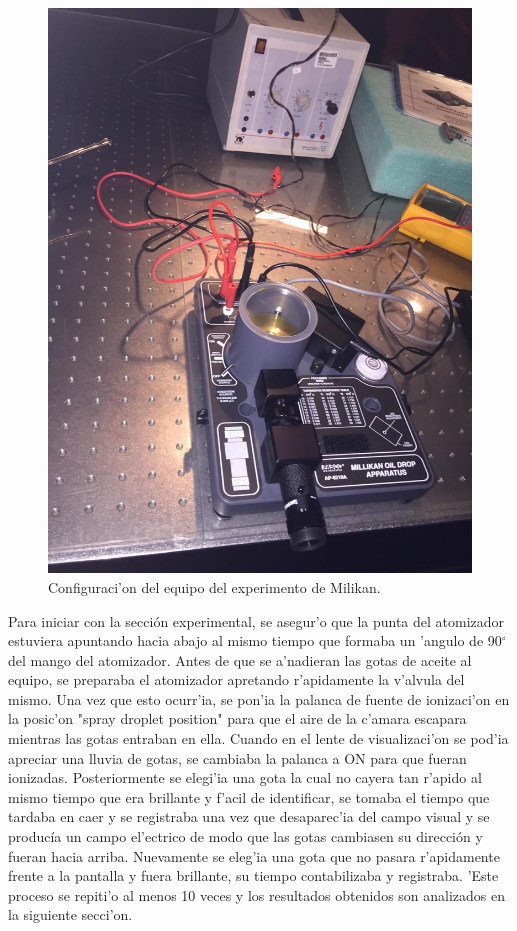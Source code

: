 \documentclass{article}
\begin{document}
\begin{multicols}{2}
\begin{figure}[H]
	\centering
	\includegraphics[scale = 0.13]{Milikan-set-up.jpeg}
	\caption{Configuraci'on del equipo del experimento de Milikan.}
	\label{Fig:1}
\end{figure}

Para iniciar con la sección experimental, se asegur'o que la punta del atomizador estuviera apuntando hacia abajo al mismo tiempo que formaba un 'angulo de 90$^{\circ}$ del mango del atomizador. Antes de que se a'nadieran las gotas de aceite al equipo, se preparaba el atomizador apretando r'apidamente la v'alvula del mismo. Una vez que esto ocurr'ia, se pon'ia la palanca de fuente de ionizaci'on en la posic'on "spray droplet position" para que el aire de la c'amara escapara mientras las gotas entraban en ella. Cuando en el lente de visualizaci'on se pod'ia apreciar una lluvia de gotas, se cambiaba la palanca a ON para que fueran ionizadas. Posteriormente se elegi'ia una gota la cual no cayera tan r'apido al mismo tiempo que era brillante y f'acil de identificar, se tomaba el tiempo que tardaba en caer y se registraba una vez que desaparec'ia del campo visual y se producía un campo el'ectrico de modo que las gotas cambiasen su dirección y fueran hacia arriba. Nuevamente se eleg'ia una gota que no pasara r'apidamente frente a la pantalla y fuera brillante, su tiempo contabilizaba y registraba. 'Este proceso se repiti'o al menos 10 veces y los resultados obtenidos son analizados en la siguiente secci'on.


\end{multicols}
\end{document}
